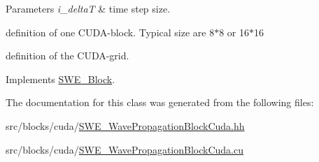 \begin{DoxyParams}{Parameters}
{\em i\-\_\-delta\-T} & time step size. \\
\hline
\end{DoxyParams}
definition of one C\-U\-D\-A-\/block. Typical size are 8$\ast$8 or 16$\ast$16

definition of the C\-U\-D\-A-\/grid. 

Implements \hyperlink{classSWE__Block_ab2b4b659f23d5d45413dece8d2da3298}{S\-W\-E\-\_\-\-Block}.



The documentation for this class was generated from the following files\-:\begin{DoxyCompactItemize}
\item 
src/blocks/cuda/\hyperlink{SWE__WavePropagationBlockCuda_8hh}{S\-W\-E\-\_\-\-Wave\-Propagation\-Block\-Cuda.\-hh}\item 
src/blocks/cuda/\hyperlink{SWE__WavePropagationBlockCuda_8cu}{S\-W\-E\-\_\-\-Wave\-Propagation\-Block\-Cuda.\-cu}\end{DoxyCompactItemize}
